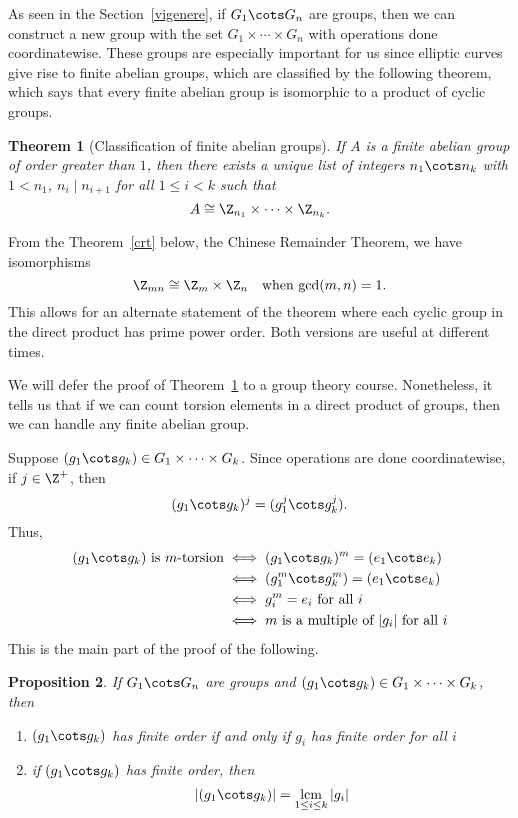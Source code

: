 \documentclass[12pt]{amsart}
\theoremstyle{plain}
\newtheorem{thm}{Theorem}[section]
\newtheorem{prop}[thm]{Proposition}
\theoremstyle{definition}
\theoremstyle{remark}
\begin{document}
As seen in the Section~\ref{vigenere}, if $G_1\cots G_n$ are groups,
then we can construct a new group with the set $G_1\times\cdots\times G_n$ with
operations done coordinatewise.  These groups are especially important
for us since elliptic curves give rise to finite abelian groups, which
are classified by the following theorem, which says that every finite
abelian group is isomorphic to a product of cyclic groups.
\begin{thm}[Classification of finite abelian groups]
\label{finiteabelian}
  If $A$ is a finite abelian group of order greater than $1$, then
  there exists a unique list of integers $n_1\cots n_k$ with $1<n_1$,
  $n_i\mid n_{i+1}$ for all $1\leq i<k$ such that 
  \[ A \cong \Z_{n_1}\times\cdots\times \Z_{n_k}.\]
\end{thm}
From the Theorem~\ref{crt} below, the Chinese Remainder Theorem, we
have isomorphisms
\[ \Z_{mn} \cong \Z_m\times \Z_n \quad\text{when $\gcd(m,n)=1$}.\]
This allows for an alternate statement of the theorem where each
cyclic group in the direct product has prime power order.  Both
versions are useful at different times.

We will defer the proof of Theorem~\ref{finiteabelian} to a group
theory course.  Nonetheless, it tells us that if we can count torsion
elements in a direct product of groups, then we can handle any finite
abelian group.

Suppose $(g_1\cots g_k)\in G_1\times\cdots \times G_k$.  Since
operations are done coordinatewise, if $j\in\Z^+$, then
\[ (g_1\cots g_k)^j = (g_1^j\cots g_k^j).\]
Thus,
\begin{align*}
(g_1\cots g_k)\text{ is $m$-torsion}
&\iff  (g_1\cots g_k)^m=(e_1\cots  e_k) \\
&\iff  (g_1^m\cots g_k^m)=(e_1\cots  e_k) \\
&\iff g_i^m=e_i \text{ for all $i$} \\
&\iff m \text{ is a multiple of $|g_i|$ for all $i$}
\end{align*}
This is the main part of the proof of the following.
\begin{prop}
If $G_1\cots G_n$ are groups and $(g_1\cots g_k)\in G_1\times\cdots
\times G_k$, then
\begin{enumerate}
\item $(g_1\cots g_k)$ has finite order if and only if $g_i$ has
  finite order for all $i$
\item if $(g_1\cots g_k)$ has finite order, then
\[ |(g_1\cots g_k)| = \operatorname*{lcm}_{1\leq i \leq k} |g_i|\]
\end{enumerate}
\end{prop}
\end{document}
